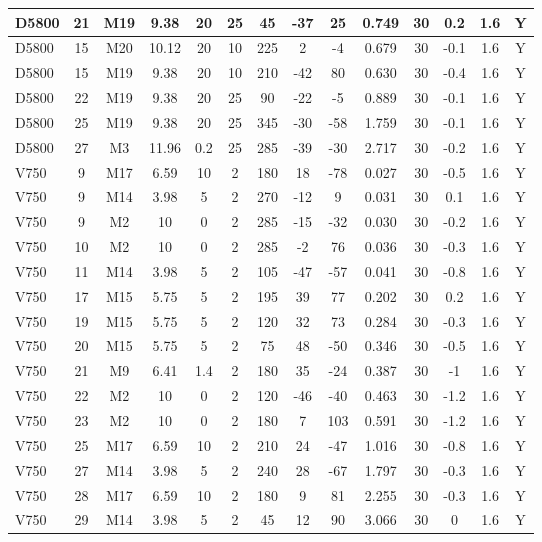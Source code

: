 \documentclass{article}
\begin{document}
\begin{center}
\begin{longtable}{|l|c|c|c|c|c|c|c|c|c|c|c|c|c|}
D5800	&	21	&	M19	&	9.38	&	20	&	25	&	45	&	-37	&	25	&	0.749	&	30	&	0.2	&	1.6	&	Y	\\\hline
D5800	&	15	&	M20	&	10.12	&	20	&	10	&	225	&	2	&	-4	&	0.679	&	30	&	-0.1	&	1.6	&	Y	\\\hline
D5800	&	15	&	M19	&	9.38	&	20	&	10	&	210	&	-42	&	80	&	0.630	&	30	&	-0.4	&	1.6	&	Y	\\\hline
D5800	&	22	&	M19	&	9.38	&	20	&	25	&	90	&	-22	&	-5	&	0.889	&	30	&	-0.1	&	1.6	&	Y	\\\hline
D5800	&	25	&	M19	&	9.38	&	20	&	25	&	345	&	-30	&	-58	&	1.759	&	30	&	-0.1	&	1.6	&	Y	\\\hline
D5800	&	27	&	M3	&	11.96	&	0.2	&	25	&	285	&	-39	&	-30	&	2.717	&	30	&	-0.2	&	1.6	&	Y	\\\hline
V750	&	9	&	M17	&	6.59	&	10	&	2	&	180	&	18	&	-78	&	0.027	&	30	&	-0.5	&	1.6	&	Y	\\\hline
V750	&	9	&	M14	&	3.98	&	5	&	2	&	270	&	-12	&	9	&	0.031	&	30	&	0.1	&	1.6	&	Y	\\\hline
V750	&	9	&	M2	&	10	&	0	&	2	&	285	&	-15	&	-32	&	0.030	&	30	&	-0.2	&	1.6	&	Y	\\\hline
V750	&	10	&	M2	&	10	&	0	&	2	&	285	&	-2	&	76	&	0.036	&	30	&	-0.3	&	1.6	&	Y	\\\hline
V750	&	11	&	M14	&	3.98	&	5	&	2	&	105	&	-47	&	-57	&	0.041	&	30	&	-0.8	&	1.6	&	Y	\\\hline
V750	&	17	&	M15	&	5.75	&	5	&	2	&	195	&	39	&	77	&	0.202	&	30	&	0.2	&	1.6	&	Y	\\\hline
V750	&	19	&	M15	&	5.75	&	5	&	2	&	120	&	32	&	73	&	0.284	&	30	&	-0.3	&	1.6	&	Y	\\\hline
V750	&	20	&	M15	&	5.75	&	5	&	2	&	75	&	48	&	-50	&	0.346	&	30	&	-0.5	&	1.6	&	Y	\\\hline
V750	&	21	&	M9	&	6.41	&	1.4	&	2	&	180	&	35	&	-24	&	0.387	&	30	&	-1	&	1.6	&	Y	\\\hline
V750	&	22	&	M2	&	10	&	0	&	2	&	120	&	-46	&	-40	&	0.463	&	30	&	-1.2	&	1.6	&	Y	\\\hline
V750	&	23	&	M2	&	10	&	0	&	2	&	180	&	7	&	103	&	0.591	&	30	&	-1.2	&	1.6	&	Y	\\\hline
V750	&	25	&	M17	&	6.59	&	10	&	2	&	210	&	24	&	-47	&	1.016	&	30	&	-0.8	&	1.6	&	Y	\\\hline
V750	&	27	&	M14	&	3.98	&	5	&	2	&	240	&	28	&	-67	&	1.797	&	30	&	-0.3	&	1.6	&	Y	\\\hline
V750	&	28	&	M17	&	6.59	&	10	&	2	&	180	&	9	&	81	&	2.255	&	30	&	-0.3	&	1.6	&	Y	\\\hline
V750	&	29	&	M14	&	3.98	&	5	&	2	&	45	&	12	&	90	&	3.066	&	30	&	0	&	1.6	&	Y	\\\hline

\end{longtable}
\end{center}
\end{document}
